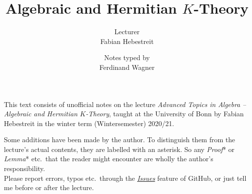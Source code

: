 \documentclass[a4paper, 10pt, oneside, DIV=9, chapterprefix=true, numbers=enddot,bibliography=totoc]{scrbook}
\title{Algebraic and Hermitian $K$-Theory}
\author{{\normalsize Lecturer}\\
	Fabian Hebestreit}
\date{{\normalsize Notes typed by}\\
	Ferdinand Wagner}
\begin{document}
	\frontmatter
	\renewcommand{\thedummy}{\arabic{dummy}}
	\maketitle
	\noindent This text consists of unofficial notes on the lecture \emph{Advanced Topics in Algebra -- Algebraic and Hermitian $K$-Theory}, taught at the University of
	Bonn by Fabian Hebestreit in the winter term (Wintersemester) 2020/21.
	
	Some additions have been made by the author. To distinguish them from the lecture's actual contents, they are labelled with an asterisk. So any \emph{Proof}* or \emph{Lemma}* etc.\ that the reader might encounter are wholly the author's responsibility.
	\\[\thmsep]Please report errors, typos etc.\ through the \href{https://github.com/FlorianAdler/AlgebraBonn/issues/new}{\emph{Issues}} feature of GitHub, or just tell me before or after the lecture.
	
	
	\tableofcontents
	\setcounter{llecture}{-1}
	\mainmatter{}
	\renewcommand{\thedummy}{\thechapter.\arabic{dummy}}
	\setcounter{chapter}{-1}
	\renewcommand{\thechapter}{\arabic{chapter}}
	
	\renewcommand{\thechapter}{\Roman{chapter}}
\end{document}
